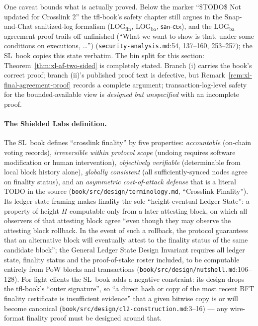 \documentclass[11pt,a4paper]{article}
\theoremstyle{definition}
\begin{document}
One caveat bounds what is actually proved. Below the marker ``\$TODO\$ Not
updated for Crosslink 2'' the tfl-book's safety chapter still argues in the
Snap-and-Chat sanitized-log formalism ($\mathrm{LOG}_{\mathrm{fin}}$,
$\mathrm{LOG}_{\mathrm{ba}}$, $\mathsf{san\text{-}ctx}$), and the
$\mathrm{LOG}_{\mathrm{ba}}$ agreement proof trails off unfinished (``What
we want to show is that, under some conditions on executions, \ldots'')
(\texttt{security-analysis.md}:54, 137--160, 253--257); the SL~book copies
this state verbatim. The bin split for this section:
Theorem~\ref{thm:xl-af-two-sided} is completely stated. Branch (i) carries
the book's correct proof; branch (ii)'s published proof text is defective,
but Remark~\ref{rem:xl-final-agreement-proof} records a complete argument;
transaction-log-level safety for the bounded-available view is
\emph{designed but unspecified} with an incomplete proof.

\paragraph{The Shielded Labs definition.} The SL~book defines ``crosslink
finality'' by five properties: \emph{accountable} (on-chain voting
records), \emph{irreversible within protocol scope} (undoing requires
software modification or human intervention), \emph{objectively
verifiable} (determinable from local block history alone), \emph{globally
consistent} (all sufficiently-synced nodes agree on finality status), and
an \emph{asymmetric cost-of-attack defense} that is a literal TODO in the
source (\texttt{book/src/design/terminology.md}, ``Crosslink Finality'').
Its ledger-state framing makes finality the sole ``height-eventual Ledger
State'': a property of height $H$ computable only from a later attesting
block, on which all observers of that attesting block agree ``even though
they may observe the attesting block rollback. In the event of such a
rollback, the protocol guarantees that an alternative block will
eventually attest to the finality status of the same candidate block'';
the General Ledger State Design Invariant requires all ledger state,
finality status and the proof-of-stake roster included, to be computable
entirely from PoW blocks and transactions
(\texttt{book/src/design/nutshell.md}:106--128). For light clients the
SL~book adds a negative constraint: its design drops the tfl-book's
``outer signature'', so ``a direct hash or copy of the most recent BFT
finality certificate is insufficient evidence'' that a given bitwise copy
is or will become canonical
(\texttt{book/src/design/cl2-construction.md}:3--16) --- any wire-format
finality proof must be designed around that.
\end{document}
